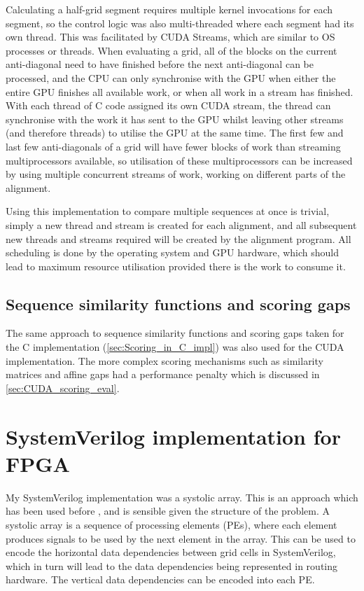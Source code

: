 Calculating a half-grid segment requires multiple kernel invocations for each segment, so the control logic was also multi-threaded where each segment had its own thread.
This was facilitated by CUDA Streams, which are similar to OS processes or threads.
When evaluating a grid, all of the blocks on the current anti-diagonal need to have finished before the next anti-diagonal can be processed, and the CPU can only synchronise with the GPU when either the entire GPU finishes all available work, or when all work in a stream has finished.
With each thread of C code assigned its own CUDA stream, the thread can synchronise with the work it has sent to the GPU whilst leaving other streams (and therefore threads) to utilise the GPU at the same time.
The first few and last few anti-diagonals of a grid will have fewer blocks of work than streaming multiprocessors available, so utilisation of these multiprocessors can be increased by using multiple concurrent streams of work, working on different parts of the alignment.

Using this implementation to compare multiple sequences at once is trivial, simply a new thread and stream is created for each alignment, and all subsequent new threads and streams required will be created by the alignment program.
All scheduling is done by the operating system and GPU hardware, which should lead to maximum resource utilisation provided there is the work to consume it.

\subsection{Sequence similarity functions and scoring gaps}
\label{sec:Scoring_in_CUDA_impl}

The same approach to sequence similarity functions and scoring gaps taken for the C implementation (\cref{sec:Scoring_in_C_impl}) was also used for the CUDA implementation.
The more complex scoring mechanisms such as similarity matrices and affine gaps had a performance penalty which is discussed in \cref{sec:CUDA_scoring_eval}.

\section{SystemVerilog implementation for FPGA}
\label{sec:SV_impl}

My SystemVerilog implementation was a systolic array.
This is an approach which has been used before \cite{FPGA_Impl}, and is sensible given the structure of the problem.
A systolic array is a sequence of processing elements (PEs), where each element produces signals to be used by the next element in the array.
This can be used to encode the horizontal data dependencies between grid cells in SystemVerilog, which in turn will lead to the data dependencies being represented in routing hardware.
The vertical data dependencies can be encoded into each PE.

